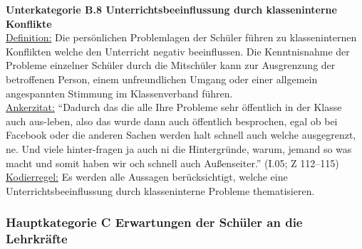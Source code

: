 \textbf{Unterkategorie B.8 Unterrichtsbeeinflussung durch klasseninterne Konflikte}\\
\underline{Definition:} Die persönlichen Problemlagen der Schüler führen zu klasseninternen Konflikten welche den Unterricht negativ beeinflussen. Die Kenntnisnahme der Probleme einzelner Schüler durch die Mitschüler kann zur Ausgrenzung der betroffenen Person, einem unfreundlichen Umgang oder einer allgemein angespannten Stimmung im Klassenverband führen.\\
\underline{Ankerzitat:} "`Dadurch das die alle Ihre Probleme sehr öffentlich in der Klasse auch aus-leben, also das wurde dann auch öffentlich besprochen, egal ob bei Facebook oder die anderen Sachen werden halt schnell auch welche ausgegrenzt, ne. Und viele hinter-fragen ja auch ni die Hintergründe, warum, jemand so was macht und somit haben wir och schnell auch Außenseiter."' (I.05; Z 112--115)\\
\underline{Kodierregel:} Es werden alle Aussagen berücksichtigt, welche eine Unterrichtsbeeinflussung durch klasseninterne Probleme thematisieren.\\

\subsubsection{Hauptkategorie C Erwartungen der Schüler an die Lehrkräfte}
\label{sec:HauptkategorieCErwartungenDerSchülerAnDieLehrkräfte}

